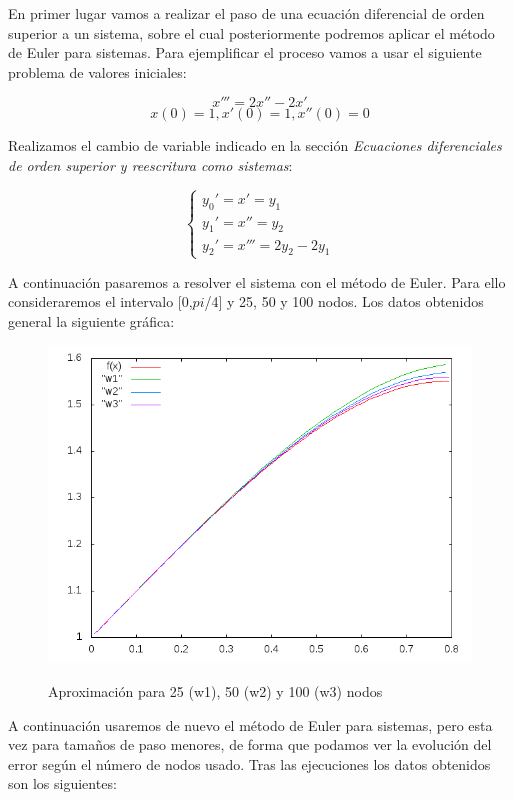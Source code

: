 \documentclass[12pt]{article}       %
\begin{document}
En primer lugar vamos a realizar el paso de una ecuación diferencial de orden superior a un sistema, sobre el cual posteriormente podremos aplicar el método de Euler para sistemas. Para ejemplificar el proceso vamos a usar el siguiente problema de valores iniciales: 

$$
x''' = 2x'' - 2x'     %
$$
$$
x(0)=1, x'(0)=1, x''(0)=0
$$

Realizamos el cambio de variable indicado en la sección \textit{Ecuaciones diferenciales de orden superior y reescritura como sistemas}:

$$
\begin{cases}
y_0' = x' = y_1\\
y_1' = x'' = y_2\\
y_2' = x''' = 2y_2 - 2y_1
\end{cases}
$$

A continuación pasaremos a resolver el sistema con el método de Euler. Para ello consideraremos el intervalo [0,$pi$/4] y 25, 50 y 100 nodos. Los datos obtenidos general la siguiente gráfica: 

\begin{figure}[H]
\centering
\includegraphics[scale=0.65]{img/grafica.png}
\label{figura1}
\caption{Aproximación para 25 (w1), 50 (w2) y 100 (w3) nodos} 
\end{figure}

A continuación usaremos de nuevo el método de Euler para sistemas, pero esta vez para tamaños de paso menores, de forma que podamos ver la evolución del error según el número de nodos usado. Tras las ejecuciones los datos obtenidos son los siguientes:
\end{document}
